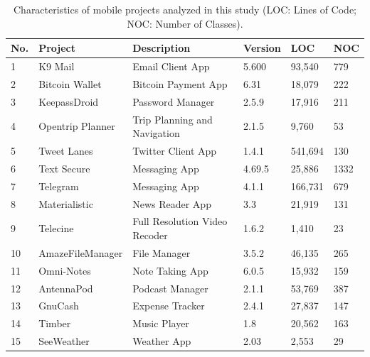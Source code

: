 \documentclass[AMA,Times1COL]{WileyNJDv5} %
\begin{document}
\begin{table}[h]
	\caption{Characteristics of mobile projects analyzed in this study (LOC: Lines of Code; NOC: Number of Classes). } %
	\centering %
	\begin{tabular*}{\textwidth}{@{\extracolsep\fill}llllll@{\extracolsep\fill}}%
		\toprule
		\textbf{No.} & \textbf{Project} & \textbf{Description}  & \textbf{Version} & \textbf{LOC} & \textbf{NOC} \\ 
		\bottomrule
		1 & K9 Mail & Email Client App & 5.600 & 93,540 & 779 \\ 
		2 & Bitcoin Wallet & Bitcoin Payment App & 6.31 & 18,079 & 222 \\ 
		3 &  KeepassDroid & Password Manager & 2.5.9 & 17,916 & 211 \\ 
		4 & Opentrip Planner &  Trip Planning and Navigation & 2.1.5 & 9,760 & 53 \\ 
		5 & Tweet Lanes & Twitter Client App & 1.4.1 & 541,694 & 130 \\ 
		6 & Text Secure & Messaging App & 4.69.5 & 25,886 & 1332 \\ 
		7 & Telegram & Messaging App & 4.1.1 & 166,731 & 679 \\ 
		8 & Materialistic & News Reader App & 3.3 & 21,919 & 131 \\ 
		9 & Telecine & Full Resolution Video Recoder  & 1.6.2 & 1,410 & 23 \\ 
		10 & AmazeFileManager & File Manager &  3.5.2 & 46,135 & 265 \\ 
		11 & Omni-Notes & Note Taking App & 6.0.5 & 15,932 & 159 \\ 
		12 & AntennaPod & Podcast Manager & 2.1.1 & 53,769 & 387 \\ 
		13 & GnuCash & Expense Tracker & 2.4.1 & 27,837 & 147 \\ 
		14 & Timber & Music Player & 1.8 & 20,562 & 163 \\ 
		15 & SeeWeather  & Weather App & 2.03 & 2,553 & 29 \\ 
		\bottomrule
	\end{tabular*}
	\label{table:selected_projects-mobile} %
\end{table}
\end{document}

